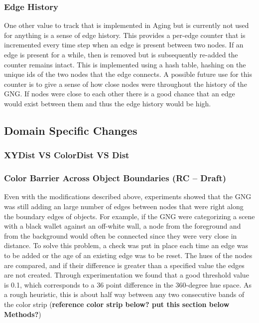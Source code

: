 \documentclass{article}
\renewcommand{\|}{\origbar} %
\begin{document}
\subsubsection{Edge History}

One other value to track that is implemented in Aging but is currently not used for anything is a sense of edge history. This provides a per-edge counter that is incremented every time step when an edge is present between two nodes. If an edge is present for a while, then is removed but is subsequently re-added the counter remains intact. This is implemented using a hash table, hashing on the unique ids of the two nodes that the edge connects. A possible future use for this counter is to give a sense of how close nodes were throughout the history of the GNG. If nodes were close to each other there is a good chance that an edge would exist between them and thus the edge history would be high.

\subsection{Domain Specific Changes}

\subsubsection{XYDist VS ColorDist VS Dist}

\subsubsection{Color Barrier Across Object Boundaries (RC -- Draft)}

Even with the modifications described above, experiments showed that the GNG was still adding an large number of edges between nodes that were right along the boundary edges of objects. For example, if the GNG were categorizing a scene with a black wallet against an off-white wall, a node from the foreground and from the background would often be connected since they were very close in distance. To solve this problem, a check was put in place each time an edge was to be added or the age of an existing edge was to be reset. The hues of the nodes are compared, and if their difference is greater than a specified value the edges are not created. Through experimentation we found that a good threshold value is 0.1, which corresponds to a 36 point difference in the 360-degree hue space. As a rough heuristic, this is about half way between any two consecutive bands of the color strip ({\bf reference color strip below? put this section below Methods?})
\end{document}
